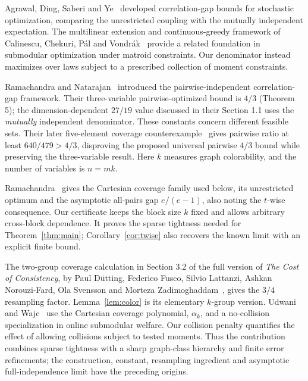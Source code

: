 Agrawal, Ding, Saberi and Ye~\cite{Agrawal2012} developed correlation-gap
bounds for stochastic optimization, comparing the unrestricted coupling
with the mutually independent expectation. The multilinear extension and
continuous-greedy framework of Calinescu, Chekuri, P\'al and
Vondr\'ak~\cite{Calinescu2011} provide a related foundation in submodular
optimization under matroid constraints. Our denominator instead maximizes
over laws subject to a prescribed collection of moment constraints.

Ramachandra and Natarajan~\cite{RamachandraNatarajan2025} introduced the
pairwise-independent correlation-gap framework. Their three-variable
pairwise-optimized bound is \(4/3\) (Theorem 5); the dimension-dependent
\(27/19\) value discussed in their Section 1.1 uses the \emph{mutually}
independent denominator. These constants concern different feasible sets.
Their later five-element coverage counterexample~\cite{RamachandraNatarajan2026}
gives pairwise ratio at least \(640/479>4/3\), disproving the proposed
universal pairwise \(4/3\) bound while preserving the three-variable result.
Here \(k\) measures graph colorability, and the number of variables is
\(n=mk\).

Ramachandra~\cite[Theorem 2 and Section 4]{Ramachandra2026} gives the
Cartesian coverage family used below, its unrestricted optimum and the
asymptotic all-pairs gap \(e/(e-1)\), also noting the \(t\)-wise consequence.
Our certificate keeps the block size \(k\) fixed and allows arbitrary
cross-block dependence. It proves the sparse tightness needed for
Theorem~\ref{thm:main}; Corollary~\ref{cor:twise} also recovers the known
limit with an explicit finite bound.

The two-group coverage calculation in Section 3.2 of the full version of
\emph{The Cost of Consistency}, by Paul D\"utting, Federico Fusco, Silvio
Lattanzi, Ashkan Norouzi-Fard, Ola Svensson and Morteza
Zadimoghaddam~\cite{Dutting2025}, gives the \(3/4\) resampling factor.
Lemma~\ref{lem:color} is its elementary \(k\)-group version. Udwani and
Wajc~\cite[Section 3.1]{UdwaniWajc2026} use the Cartesian coverage polynomial,
\(\alpha_k\), and a no-collision specialization in online submodular welfare.
Our collision penalty quantifies the effect of allowing collisions subject
to tested moments. Thus the contribution combines sparse tightness with a
sharp graph-class hierarchy and finite error refinements; the construction,
constant, resampling ingredient and asymptotic full-independence limit have
the preceding origins.

